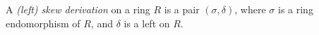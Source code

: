 \documentclass[12pt]{article}
\begin{document}
A {\it (left) skew derivation}
on a ring $R$ is a pair $(\sigma, \delta)$,
where $\sigma$ is a ring endomorphism of $R$,
and $\delta$ is a left  on $R$.
\end{document}
